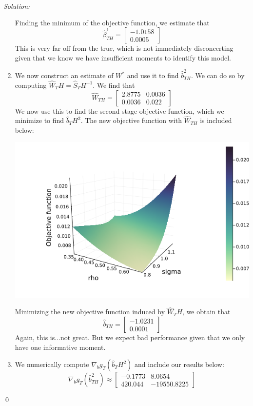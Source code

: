 \documentclass[12pt]{article}
\newenvironment{sol}
    {\emph{Solution:}
    }
    {
    \qed
    }
\begin{document}
\begin{sol}
\begin{enumerate}[label=\alph*) ]
        Finding the minimum of the objective function, we estimate that
        \[\hat{\beta}_{TH}^1 = \begin{bmatrix} -1.0158 \\ 0.0005\end{bmatrix}\]
        This is very far off from the true, which is not immediately disconcerting given that we know we have insufficient moments to identify this model.
        \item We now construct an estimate of $W^*$ and use it to find $\hat{b}_{TH}^2$. We can do so by computing $\hat{W}_TH = \hat{S}_TH^{-1}$. We find that
        \[\hat{W}_{TH} = \begin{bmatrix}2.8775 & 0.0036\\ 0.0036& 0.022\end{bmatrix}\]
        We now use this to find the second stage objective function, which we minimize to find $\hat{b}_TH^2$. The new objective function with $\hat{W}_{TH}$ is included below:
        \begin{center}
            \includegraphics[scale=0.4]{jthplot_1_2nd.png}
        \end{center}
        Minimizing the new objective function induced by $\hat{W}_TH$, we obtain that
        \[\hat{b}_{TH} = \begin{bmatrix}-1.0231 \\0.0001\end{bmatrix}\]
        Again, this is$\ldots$not great. But we expect bad performance given that we only have one informative moment.
        \item We numerically compute $\nabla_b g_T(\hat{b}_TH^2)$ and include our results below:
        \[\nabla_b g_T(\hat{b}_{TH}^2) \approx \begin{bmatrix}-0.1773 &8.0654\\ 420.044 & -19550.8225\end{bmatrix}\]

\end{enumerate}
\end{sol}
\end{document}
